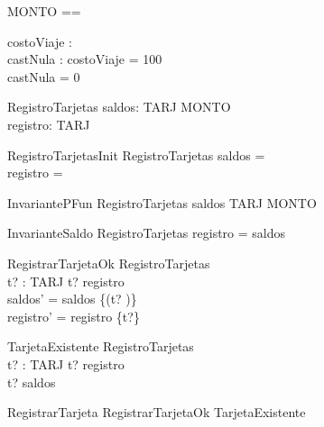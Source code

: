 \begin{zed}
[TARJ]
\end{zed}

\begin{zed}
MONTO == \nat 
\end{zed}

\begin{axdef}
costoViaje : \nat \\
castNula : \nat
\where
costoViaje = 100 \\
castNula = 0
\end{axdef}

\begin{schema}{RegistroTarjetas}
    saldos: TARJ \rel MONTO \\
    registro: \power TARJ
\end{schema}

\begin{schema}{RegistroTarjetasInit}
    RegistroTarjetas
\where
    saldos = \emptyset \\
    registro = \emptyset
\end{schema}

\begin{schema}{InvariantePFun}
    RegistroTarjetas
\where
    saldos \in TARJ \pfun MONTO
\end{schema}

\begin{schema}{InvarianteSaldo}
    RegistroTarjetas
\where
    registro = \dom saldos
\end{schema}

\begin{schema}{RegistrarTarjetaOk}
    \Delta RegistroTarjetas \\
    t? : TARJ 
\where
    t? \notin registro \\ 
    saldos' = saldos \cup \{(t? )\} \\
    registro' = registro \cup \{t?\} 
\end{schema}

\begin{schema}{TarjetaExistente}
    \Xi RegistroTarjetas \\
    t? : TARJ 
\where
    t? \in registro \\
    t? \in \dom saldos 
\end{schema}

\begin{zed}
    RegistrarTarjeta  RegistrarTarjetaOk \lor TarjetaExistente \\
\end{zed}

